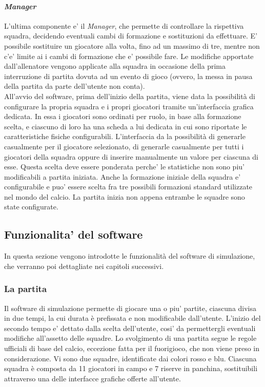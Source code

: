 \paragraph{\textit{Manager}} \label{sec:struttura_manager} L'ultima componente e' il \textit{Manager}, che permette di controllare la rispettiva squadra, decidendo eventuali cambi di formazione e sostituzioni da effettuare. E' possibile sostituire un giocatore alla volta, fino ad un massimo di tre, mentre non c'e' limite ai i cambi di formazione che e' possibile fare. Le modifiche apportate dall'allenatore vengono applicate alla squadra in occasione della prima interruzione di partita dovuta ad un evento di gioco (ovvero, la messa in pausa della partita da parte dell'utente non conta).\\

All'avvio del software, prima dell'inizio della partita, viene data la possibilit\`{a} di configurare la propria squadra e i propri giocatori tramite un'interfaccia grafica dedicata. In essa i giocatori sono ordinati per ruolo, in base alla formazione scelta, e ciascuno di loro ha una scheda a lui dedicata in cui sono riportate le caratteristiche fisiche configurabili. L'interfaccia da la possibilit\`{a} di generarle casualmente per il giocatore selezionato, di generarle casualmente per tutti i giocatori della squadra oppure di inserire manualmente un valore per ciascuna di esse. Questa scelta deve essere ponderata perche' le statistiche non sono piu' modificabili a partita iniziata. Anche la formazione iniziale della squadra e' configurabile e puo' essere scelta fra tre possibili formazioni standard utilizzate nel mondo del calcio. La partita inizia non appena entrambe le squadre sono state configurate.

\subsection{Funzionalita' del software}
\label{sec:funzionalita_del_software}

In questa sezione vengono introdotte le funzionalit\`{a} del software di simulazione, che verranno poi dettagliate nei capitoli successivi.

\subsubsection{La partita}
\label{sec:analisi_partita}

Il software di simulazione permette di giocare una o piu' partite, ciascuna divisa in due tempi, la cui durata \`{e} prefissata e non modificabile dall'utente. L'inizio del secondo tempo e' dettato dalla scelta dell'utente, cosi' da permettergli eventuali modifiche all'assetto delle squadre. Lo svolgimento di una partita segue le regole ufficiali di base del calcio, eccezione fatta per il fuorigioco, che non viene preso in considerazione. Vi sono due squadre, identificate dai colori rosso e blu. Ciascuna squadra \`{e} composta da 11 giocatori in campo e 7 riserve in panchina, sostituibili attraverso una delle interfacce grafiche offerte all'utente.\\

